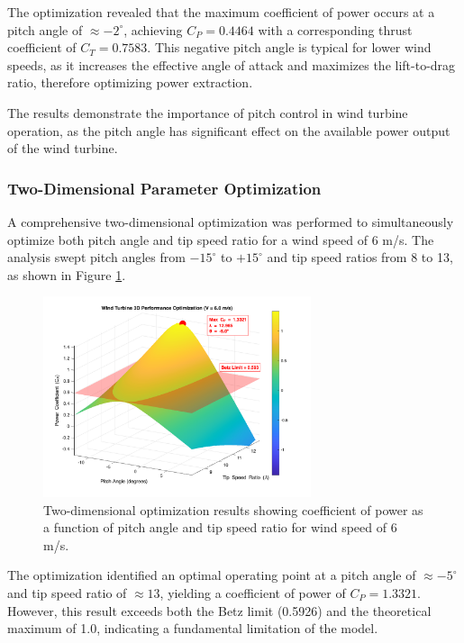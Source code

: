 \documentclass[11pt]{article}
\begin{document}
The optimization revealed that the maximum coefficient of power occurs at a pitch angle of $\approx -2^{\circ}$, achieving $C_P = 0.4464$ with a corresponding thrust coefficient of $C_T = 0.7583$. This negative pitch angle is typical for lower wind speeds, as it increases the effective angle of attack and maximizes the lift-to-drag ratio, therefore optimizing power extraction.

The results demonstrate the importance of pitch control in wind turbine operation, as the pitch angle has significant effect on the available power output of the wind turbine. 

\subsubsection{Two-Dimensional Parameter Optimization}

A comprehensive two-dimensional optimization was performed to simultaneously optimize both pitch angle and tip speed ratio for a wind speed of 6 m/s. The analysis swept pitch angles from $-15^{\circ}$ to $+15^{\circ}$ and tip speed ratios from 8 to 13, as shown in Figure \ref{fig:cp_2d}.

\begin{figure}[H]
  \centering
  \includegraphics[width=0.7\textwidth]{../../PNGS/2D_CP_Optimization_Results.png}
  \caption{Two-dimensional optimization results showing coefficient of power as a function of pitch angle and tip speed ratio for wind speed of 6 m/s.}
  \label{fig:cp_2d}
\end{figure}

The optimization identified an optimal operating point at a pitch angle of $\approx -5^{\circ}$ and tip speed ratio of $\approx 13$, yielding a coefficient of power of $C_P = 1.3321$. However, this result exceeds both the Betz limit (0.5926) and the theoretical maximum of 1.0, indicating a fundamental limitation of the model.
\end{document}
